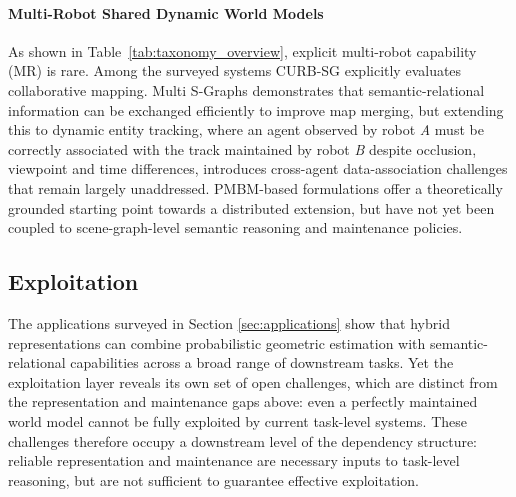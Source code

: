 \paragraph{Multi-Robot Shared Dynamic World Models}
As shown in Table~\ref{tab:taxonomy_overview}, explicit multi-robot capability (MR) is rare. Among the surveyed systems CURB-SG \cite{greve_collaborative_2024} explicitly evaluates collaborative mapping. 
Multi S-Graphs \cite{fernandez-cortizas_multi_2024} demonstrates that semantic-relational information can be exchanged efficiently to improve map merging, but extending this to dynamic entity tracking, where an agent observed by robot \textit{A} must be correctly associated with the track maintained by robot \textit{B} despite occlusion, viewpoint and time differences, introduces cross-agent data-association challenges that remain largely unaddressed. 
PMBM-based formulations \cite{ge2025batch} offer a theoretically grounded starting point towards a distributed extension, but have not yet been coupled to scene-graph-level semantic reasoning and maintenance policies.

\subsection{Exploitation}
The applications surveyed in Section \ref{sec:applications}  show that hybrid representations can combine probabilistic geometric estimation with semantic-relational capabilities across a broad range of downstream tasks. 
Yet the exploitation layer reveals its own set of open challenges, which are distinct from the representation and maintenance gaps above: even a perfectly maintained world model cannot be fully exploited by current task-level systems.
These challenges therefore occupy a downstream level of the dependency structure: reliable representation and maintenance are necessary inputs to task-level reasoning, but are not sufficient to guarantee effective exploitation.

